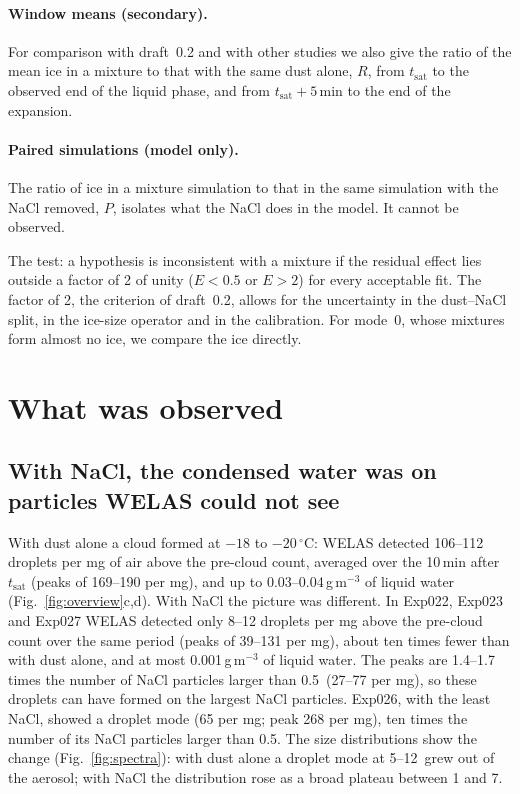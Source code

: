 \paragraph{Window means (secondary).} For comparison with draft~0.2 and with other studies we also give the ratio of the mean ice in a mixture to that with the same dust alone, $R$, from $t_\mathrm{sat}$ to the observed end of the liquid phase, and from $t_\mathrm{sat}+5$\,min to the end of the expansion.

\paragraph{Paired simulations (model only).} The ratio of ice in a mixture simulation to that in the same simulation with the NaCl removed, $P$, isolates what the NaCl does in the model. It cannot be observed.

The test: a hypothesis is inconsistent with a mixture if the residual effect lies outside a factor of 2 of unity ($E < 0.5$ or $E > 2$) for every acceptable fit. The factor of 2, the criterion of draft~0.2, allows for the uncertainty in the dust--NaCl split, in the ice-size operator and in the calibration. For mode~0, whose mixtures form almost no ice, we compare the ice directly.

\section{What was observed}\label{sec:obs}

\subsection{With NaCl, the condensed water was on particles WELAS could not see}\label{sec:obs-liquid}

With dust alone a cloud formed at $-18$ to $-20\,^\circ$C: WELAS detected 106--112 droplets per mg of air above the pre-cloud count, averaged over the 10\,min after $t_\mathrm{sat}$ (peaks of 169--190 per mg), and up to 0.03--0.04\,g\,m$^{-3}$ of liquid water (Fig.~\ref{fig:overview}c,d). With NaCl the picture was different. In Exp022, Exp023 and Exp027 WELAS detected only 8--12 droplets per mg above the pre-cloud count over the same period (peaks of 39--131 per mg), about ten times fewer than with dust alone, and at most 0.001\,g\,m$^{-3}$ of liquid water. The peaks are 1.4--1.7 times the number of NaCl particles larger than 0.5\um\ (27--77 per mg), so these droplets can have formed on the largest NaCl particles. Exp026, with the least NaCl, showed a droplet mode (65 per mg; peak 268 per mg), ten times the number of its NaCl particles larger than 0.5\um. The size distributions show the change (Fig.~\ref{fig:spectra}): with dust alone a droplet mode at 5--12\um\ grew out of the aerosol; with NaCl the distribution rose as a broad plateau between 1 and 7\um.

